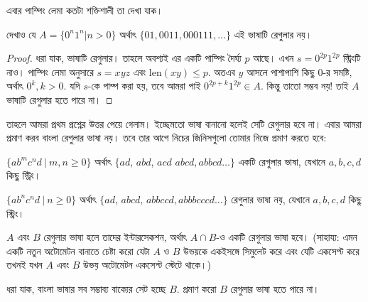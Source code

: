 এবার পাম্পিং লেমা কতটা শক্তিশালী তা দেখা যাক।

\begin{example}
	দেখাও যে $A=\{0^n1^n|n> 0\}$ অর্থাৎ $\{01, 0011, 000111, \ldots\}$ এই ভাষাটি রেগুলার নয়।
\end{example}
\begin{proof}
	ধরা যাক, ভাষাটি রেগুলার। তাহলে অবশ্যই এর একটি পাম্পিং দৈর্ঘ্য $p$ আছে। এখন $s=0^{2p}1^{2p}$ স্ট্রিংটি নাও। পাম্পিং লেমা অনুসারে $s=xyz$ এবং $\text{len}(xy)\leq p$. অতএব $y$ আসলে পাশাপাশি কিছু $0$-র সমষ্টি, অর্থাৎ $0^k, k>0$. যদি $s$-কে পাম্প করা হয়, তবে আমরা পাই $0^{2p+k}1^{2p}\in A$. কিন্তু তাতো সম্ভব নয়! তাই $A$ ভাষাটি রেগুলার হতে পারে না।
\end{proof}

তাহলে আমরা প্রথম প্রশ্নের উত্তর পেয়ে গেলাম। ইচ্ছেমতো ভাষা বানানো হলেই সেটি রেগুলার হবে না। এবার আমরা প্রমাণ করব বাংলা রেগুলার ভাষা নয়। তবে তার আগে নিচের জিনিসগুলো তোমার নিজে প্রমাণ করতে হবে:
\begin{diybox}
	\begin{noindlist}
		\item $\{ab^mc^nd\ |\ m,n\ge 0\}$ অর্থাৎ $\{ad$, $abd$, $acd$ $abcd, abbcd\ldots\}$ একটি রেগুলার ভাষা, যেখানে $a,b,c,d$ কিছু স্ট্রিং।
		\item $\{ab^nc^nd\ |\ n\ge 0\}$ অর্থাৎ $\{ad$, $abcd$, $abbccd, abbbcccd\ldots\}$ রেগুলার ভাষা নয়, যেখানে $a,b,c,d$ কিছু স্ট্রিং।
		\item $A$ এবং $B$ রেগুলার ভাষা হলে তাদের ইন্টারসেকশন, অর্থাৎ $A\cap B$-ও একটি রেগুলার ভাষা হবে। (সাহায্য: এমন একটি নতুন অটোমেটন বানাতে চেষ্টা করো যেটা $A$ ও $B$ উভয়কে একইসঙ্গে সিমুলেট করে এবং যেটি একসেপ্ট করে তখনই যখন $A$ এবং $B$ উভয় অটোমেটন একসেপ্ট স্টেটে থাকে।)
	\end{noindlist}
\end{diybox}
\begin{example}
	ধরা যাক, বাংলা ভাষার সব সম্ভাব্য বাক্যের সেট হচ্ছে $B$. প্রমাণ করো $B$ রেগুলার ভাষা হতে পারে না।
\end{example}
